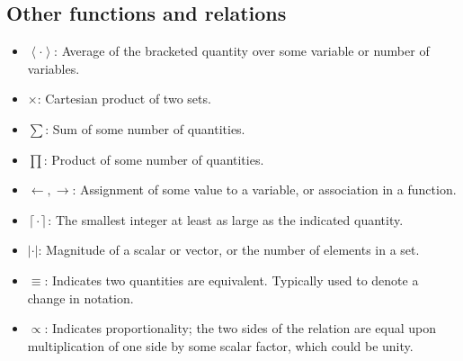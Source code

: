 \documentclass{article}
\newcommand{\angles}[1]{\ensuremath{\left\langle #1 \right\rangle}}
\newcommand{\abs}[1]{\ensuremath{\left|#1\right|}}
\newcommand{\ceil}[1]{\ensuremath{\left\lceil #1\right\rceil}}
\begin{document}
\begin{appendix}
\subsection{Other functions and relations}
\begin{itemize}
\item \angles{\cdot}: Average of the bracketed quantity over some variable or number of variables.
\item $\times$: Cartesian product of two sets.
\item $\sum$: Sum of some number of quantities.
\item $\prod$: Product of some number of quantities.
\item $\leftarrow,\rightarrow$: Assignment of some value to a variable, or association in a function.
\item $\ceil{\cdot}$: The smallest integer at least as large as the indicated quantity.
\item $\abs{\cdot}$: Magnitude of a scalar or vector, or the number of elements in a set.
\item $\equiv$: Indicates two quantities are equivalent. Typically used to denote a change in notation.
\item $\propto$: Indicates proportionality; the two sides of the relation are equal upon multiplication of one side by some scalar factor, which could be unity.
\end{itemize}

\end{appendix}
\end{document}

